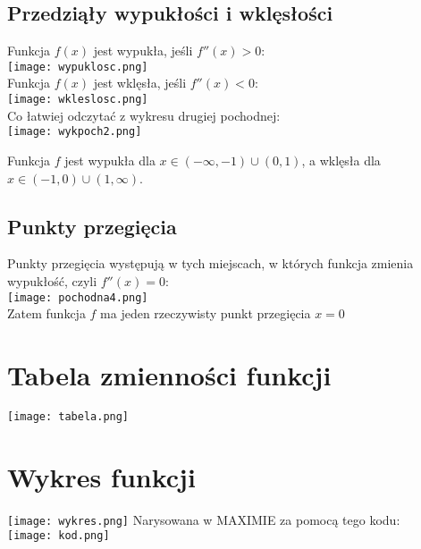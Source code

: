 \documentclass[a4paper,10pt]{article}
\begin{document}
\subsection{Przedziąły wypukłości i wklęsłości}
Funkcja $f(x)$ jest wypukła, jeśli $f''(x)>0 $:\\
\texttt{[image: wypuklosc.png]}\\
\newpage
Funkcja $f(x)$ jest wklęsła, jeśli $f''(x)<0 $:\\
\texttt{[image: wkleslosc.png]}\\

Co łatwiej odczytać z wykresu drugiej pochodnej:\\
\texttt{[image: wykpoch2.png]}

Funkcja $f$ jest wypukła dla $x \in (-\infty, -1)\cup(0,1)$, a wklęsła dla $x \in (-1,0)\cup(1,\infty)$.

\subsection{Punkty przegięcia}
Punkty przegięcia występują w tych miejscach, w których funkcja zmienia wypukłość, czyli $f''(x)=0$:\\
\texttt{[image: pochodna4.png]}\\

Zatem funkcja $f$ ma jeden rzeczywisty punkt przegięcia $x=0$


\section{Tabela zmienności funkcji}
\texttt{[image: tabela.png]}


\section{Wykres funkcji}
\texttt{[image: wykres.png]}
Narysowana w MAXIMIE za pomocą tego kodu:\\
\texttt{[image: kod.png]}
\end{document}
